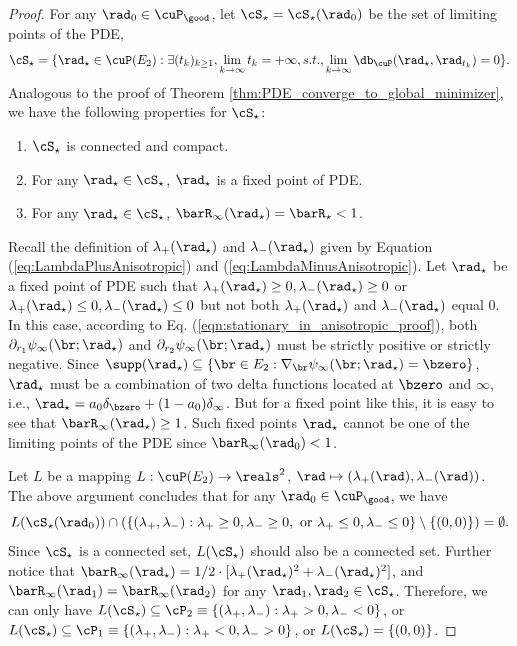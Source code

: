 \documentclass[11pt]{article}
\begin{document}
\begin{proof}
For any $\rad_0 \in \cuP_{\good}$, let $\cS_\star = \cS_\star(\rad_0)$ be the set of limiting points of the PDE, 
\[
\cS_\star = \{\rad_\star \in \cuP(E_2): \exists (t_k)_{k \ge 1}, \lim_{k\rightarrow \infty} t_k = +\infty, s.t., \lim_{k \to \infty} \db_{\cuP}(\rad_\star, \rad_{t_k}) = 0 \}. 
\]
Analogous to the proof of Theorem \ref{thm:PDE_converge_to_global_minimizer}, we have the following properties for $\cS_\star$: 
\begin{enumerate}
\item $\cS_\star$ is connected and compact. 
\item For any $\rad_\star \in \cS_\star$, $\rad_\star$ is a fixed point of PDE. 
\item For any $\rad_\star \in \cS_\star$, $\barR_\infty(\rad_\star) = \barR_\star < 1$. 
\end{enumerate}

Recall the definition of $\lambda_+(\rad_\star)$ and $\lambda_-(\rad_\star)$ given by Equation (\ref{eq:LambdaPlusAnisotropic}) and (\ref{eq:LambdaMinusAnisotropic}). Let $\rad_\star$ be a fixed point of PDE such that $\lambda_+(\rad_\star) \ge 0, \lambda_-(\rad_\star) \ge 0$ or $\lambda_+(\rad_\star) \le 0, \lambda_-(\rad_\star) \le 0$ but not both $\lambda_+(\rad_\star)$ and $\lambda_-(\rad_\star)$ equal $0$. In this case, according to Eq. (\ref{eqn:stationary_in_anisotropic_proof}), both $\partial_{r_1} \psi_\infty(\br; \rad_\star)$ and $\partial_{r_2} \psi_\infty(\br; \rad_\star)$ must be strictly positive or strictly negative. Since $\supp(\rad_\star) \subseteq \{ \br \in E_2 :  \nabla_\br \psi_\infty(\br; \rad_\star) = \bzero \}$, $\rad_\star$ must be a combination of two delta functions located at $\bzero$ and $\infty$, i.e., $\rad_\star = a_0 \delta_\bzero + (1 - a_0) \delta_\infty$. But for a fixed point like this, it is easy to see that $\barR_\infty(\rad_\star) \ge 1$. Such fixed points $\rad_\star$ cannot be one of the limiting points of the PDE since $\barR_\infty(\rad_0) < 1$. 

Let $L$ be a mapping $L: \cuP(E_2) \to \reals^2$, $\rad \mapsto (\lambda_+(\rad), \lambda_-(\rad))$. The above argument concludes that for any $\rad_0 \in \cuP_{\good}$, we have
\[
L(\cS_\star(\rad_0)) \cap ( \{ (\lambda_+, \lambda_-): \lambda_+ \ge 0, \lambda_- \ge 0, \text{ or } \lambda_+ \le 0, \lambda_- \le 0\} \setminus \{(0, 0)\} ) = \emptyset.
\]
Since $\cS_\star$ is a connected set, $L(\cS_\star)$ should also be a connected set. Further notice that $\barR_\infty(\rad_\star) = 1/2 \cdot [\lambda_+(\rad_\star)^2 + \lambda_-(\rad_\star)^2]$, and $\barR_\infty(\rad_1) = \barR_\infty(\rad_2)$ for any $\rad_1, \rad_2 \in \cS_\star$. Therefore, we can only have $L(\cS_\star) \subseteq \cP_2 \equiv \{(\lambda_+, \lambda_-): \lambda_+ > 0, \lambda_- < 0\}$, or $L(\cS_\star) \subseteq \cP_1 \equiv \{(\lambda_+, \lambda_-): \lambda_+ < 0, \lambda_- > 0\}$, or $L(\cS_\star) = \{ (0, 0) \}$. 


\end{proof}
\end{document}
